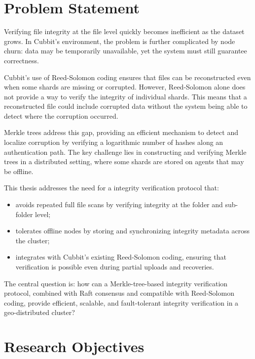 \section{Problem Statement}
Verifying file integrity at the file level quickly becomes inefficient as the dataset grows. In Cubbit's environment, the problem is further complicated by node churn: data may be temporarily unavailable, yet the system must still guarantee correctness.

Cubbit's use of Reed-Solomon coding ensures that files can be reconstructed even when some shards are missing or corrupted. However, Reed-Solomon alone does not provide a way to verify the integrity of individual shards. This means that a reconstructed file could include corrupted data without the system being able to detect where the corruption occurred.

Merkle trees address this gap, providing an efficient mechanism to detect and localize corruption by verifying a logarithmic number of hashes along an authentication path. The key challenge lies in constructing and verifying Merkle trees in a distributed setting, where some shards are stored on agents that may be offline.

This thesis addresses the need for a integrity verification protocol that:
\begin{itemize}
	\item avoids repeated full file scans by verifying integrity at the folder and sub-folder level;
	\item tolerates offline nodes by storing and synchronizing integrity metadata across the cluster;
	\item integrates with Cubbit's existing Reed-Solomon coding, ensuring that verification is possible even during partial uploads and recoveries.
\end{itemize}

The central question is: how can a Merkle-tree-based integrity verification protocol, combined with Raft consensus and compatible with Reed-Solomon coding, provide efficient, scalable, and fault-tolerant integrity verification in a geo-distributed cluster?

\section{Research Objectives}

